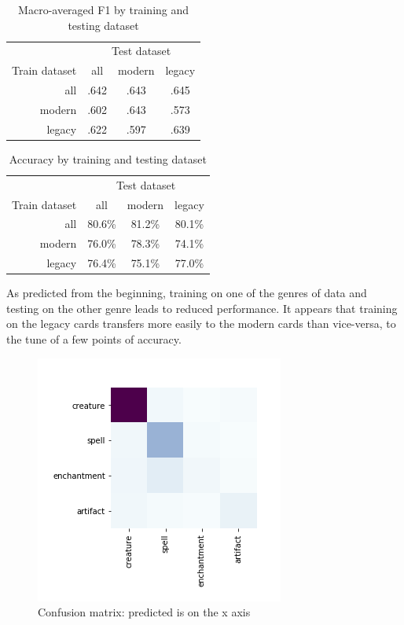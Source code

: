 \documentclass[letterpaper]{article} %
\begin{document}
\begin{table}
  \centering
  \caption{Macro-averaged F1 by training and testing dataset}
  \begin{tabular}{r | c | c | c}
    & \multicolumn{3}{c}{Test dataset}\\
    \cline{2-4}
    Train dataset & all & modern & legacy \\
    \hline
    all    & .642 & .643 & .645 \\
    modern & .602 & .643 & .573 \\
    legacy & .622 & .597 & .639 \\
  \end{tabular}
\end{table}

\begin{table}
  \centering
  \caption{Accuracy by training and testing dataset}
  \begin{tabular}{r | c | c | c}
    & \multicolumn{3}{c}{Test dataset}\\
    \cline{2-4}
    Train dataset & all & modern & legacy \\
    \hline
    all    & 80.6\% & 81.2\% & 80.1\% \\
    modern & 76.0\% & 78.3\% & 74.1\% \\
    legacy & 76.4\% & 75.1\% & 77.0\% \\
  \end{tabular}
\end{table}

As predicted from the beginning,
training on one of the genres of data
and testing on the other genre leads to reduced performance.
It appears that training on the legacy cards
transfers more easily to the modern cards
than vice-versa,
to the tune of a few points of accuracy.

\begin{figure}
  \includegraphics[width=.5\textwidth]{text-confusion-matrix}
  \caption{Confusion matrix: predicted is on the x axis}
\end{figure}
\end{document}
